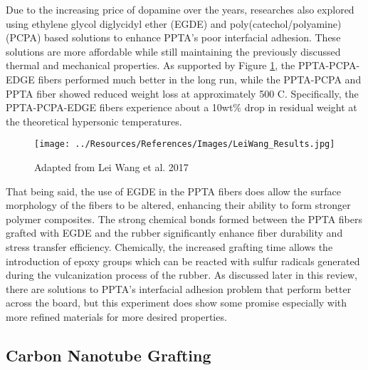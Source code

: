 \documentclass[12pt]{article}
\begin{document}
\begin{multicols}{2}
\indent Due to the increasing price of dopamine over the years, researches also explored using ethylene glycol diglycidyl ether (EGDE) and poly(catechol/polyamine) (PCPA) based solutions to enhance PPTA's poor interfacial adhesion. \citep{LeiWang2017} These solutions are more affordable while still maintaining the previously discussed thermal and mechanical properties. As supported by Figure \ref{fig:LeiWang_Results}, the PPTA-PCPA-EDGE fibers performed much better in the long run, while the PPTA-PCPA and PPTA fiber showed reduced weight loss at approximately 500 \degree C. Specifically, the PPTA-PCPA-EDGE fibers experience about a 10wt\% drop in residual weight at the theoretical hypersonic temperatures.

\begin{figure}[H]
    \centering
    \texttt{[image: ../Resources/References/Images/LeiWang\_Results.jpg]}
    \caption{\scriptsize{Adapted from Lei Wang et al. 2017 \citep{LeiWang2017}}}
    \label{fig:LeiWang_Results}
\end{figure}

\indent That being said, the use of EGDE in the PPTA fibers does allow the surface morphology of the fibers to be altered, enhancing their ability to form stronger polymer composites. The strong chemical bonds formed between the PPTA fibers grafted with EGDE and the rubber significantly enhance fiber durability and stress transfer efficiency. \citep{LeiWang2017} Chemically, the increased grafting time allows the introduction of epoxy groups which can be reacted with sulfur radicals generated during the vulcanization process of the rubber. \citep{Zhang2012} As discussed later in this review, there are solutions to PPTA's interfacial adhesion problem that perform better across the board, but this experiment does show some promise especially with more refined materials for more desired properties.

\subsection{Carbon Nanotube Grafting}


\end{multicols}
\end{document}
